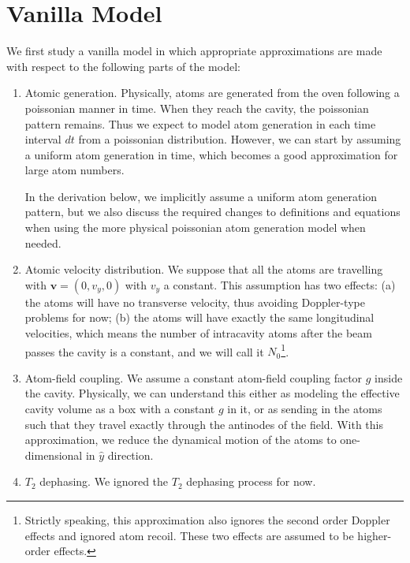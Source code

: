 \documentclass{article}
\begin{document}




\section{Vanilla Model}


We first study a vanilla model in which appropriate approximations are made with respect to the following parts of the model:
\begin{enumerate}
    \item Atomic generation. Physically, atoms are generated from the oven following a poissonian manner in time. When they reach the cavity, the poissonian pattern remains. Thus we expect to model atom generation in each time interval $dt$ from a poissonian distribution. However, we can start by assuming a uniform atom generation in time, which becomes a good approximation for large atom numbers. 
    
    In the derivation below, we implicitly assume a uniform atom generation pattern, but we also discuss the required changes to definitions and equations when using the more physical poissonian atom generation model when needed.
    
    \item Atomic velocity distribution. We suppose that all the atoms are travelling with $\textbf{v}=(0, v_y, 0)$ with $v_y$ a constant. This assumption has two effects: (a) the atoms will have no transverse velocity, thus avoiding Doppler-type problems for now; (b) the atoms will have exactly the same longitudinal velocities, which means the number of intracavity atoms after the beam passes the cavity is a constant, and we will call it $N_0$\footnote{Strictly speaking, this approximation also ignores the second order Doppler effects and ignored atom recoil. These two effects are assumed to be higher-order effects.}.
    
    \item Atom-field coupling. We assume a constant atom-field coupling factor $g$ inside the cavity. Physically, we can understand this either as modeling the effective cavity volume as a box with a constant $g$ in it, or as sending in the atoms such that they travel exactly through the antinodes of the field. With this approximation, we reduce the dynamical motion of the atoms to one-dimensional in $\hat{y}$ direction.
    
    \item $T_2$ dephasing. We ignored the $T_2$ dephasing process for now.
\end{enumerate}
\end{document}
